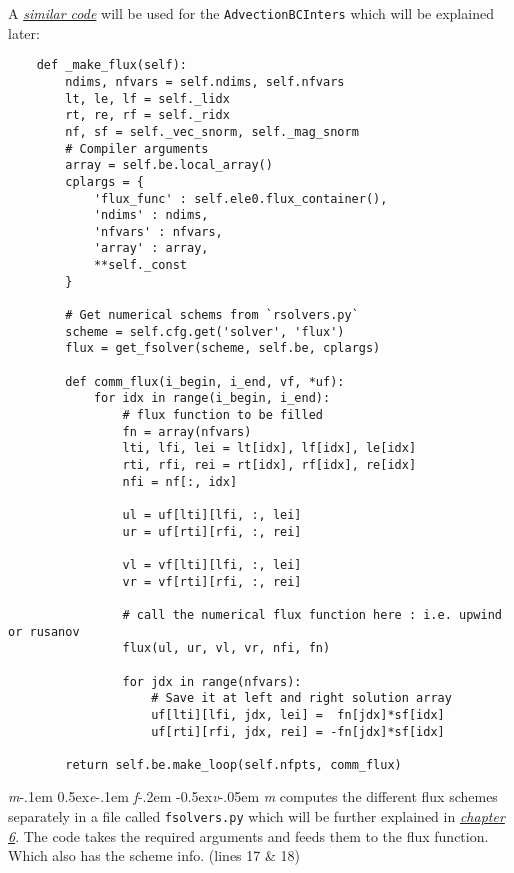 \documentclass[a4paper, 12pt]{article}
\newcommand\mefvm{%
    \textit{m}\kern-.1em%
    \raise0.5ex\hbox{\textit{e}}\kern-.1em%
    \textit{f}\kern-.2em%
    \raise-0.5ex\hbox{\textit{v}}\kern-.05em%
    \textit{m}
}
\begin{document}
A \hyperref[bcf]{\textit{similar code}} will be used for the \verb|AdvectionBCInters| which will be explained later: \\\par

\begin{verbatim}
    def _make_flux(self):
        ndims, nfvars = self.ndims, self.nfvars
        lt, le, lf = self._lidx
        rt, re, rf = self._ridx
        nf, sf = self._vec_snorm, self._mag_snorm
        # Compiler arguments
        array = self.be.local_array()
        cplargs = {
            'flux_func' : self.ele0.flux_container(),
            'ndims' : ndims,
            'nfvars' : nfvars,
            'array' : array,
            **self._const
        }

        # Get numerical schems from `rsolvers.py`
        scheme = self.cfg.get('solver', 'flux')
        flux = get_fsolver(scheme, self.be, cplargs)

        def comm_flux(i_begin, i_end, vf, *uf):
            for idx in range(i_begin, i_end):
                # flux function to be filled
                fn = array(nfvars)
                lti, lfi, lei = lt[idx], lf[idx], le[idx]
                rti, rfi, rei = rt[idx], rf[idx], re[idx]
                nfi = nf[:, idx]

                ul = uf[lti][lfi, :, lei]
                ur = uf[rti][rfi, :, rei]

                vl = vf[lti][lfi, :, lei]
                vr = vf[rti][rfi, :, rei]

                # call the numerical flux function here : i.e. upwind or rusanov
                flux(ul, ur, vl, vr, nfi, fn)

                for jdx in range(nfvars):
                    # Save it at left and right solution array
                    uf[lti][lfi, jdx, lei] =  fn[jdx]*sf[idx]
                    uf[rti][rfi, jdx, rei] = -fn[jdx]*sf[idx]

        return self.be.make_loop(self.nfpts, comm_flux)
\end{verbatim}
\par

\mefvm computes the different flux schemes separately in a file called \verb|fsolvers.py| which will be further explained in \hyperref[c6]{\textit{chapter 6}}. The code takes the required arguments and feeds them to the flux function. Which also has the scheme info. (lines 17 \& 18) \\\par
\end{document}
